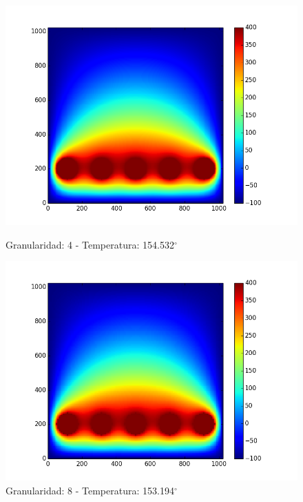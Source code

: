 \begin{figure}[htb]
\begin{center}
\includegraphics[scale=0.3]{imagenes/caso3_4.png} 
\caption{Granularidad: 4 - Temperatura: 154.532$^{\circ}$} 
        \end{center}
\endminipage\hfill
{}
\begin{center}
\includegraphics[scale=0.3]{imagenes/caso3_8.png} 
\caption{Granularidad: 8 - Temperatura: 153.194$^{\circ}$} 
        \end{center}
\endminipage\hfill 
\end{figure}

